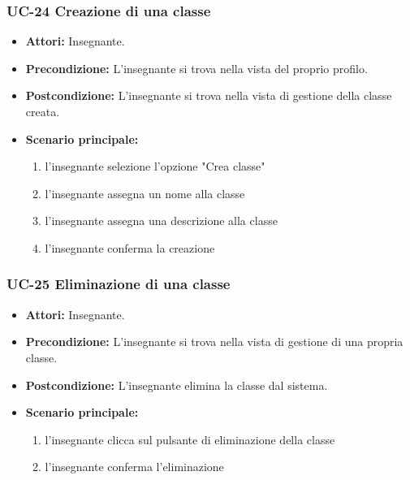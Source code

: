 \subsubsection{UC-24 Creazione di una classe}
\begin{itemize}
	\item \textbf{Attori:} Insegnante.
	\item \textbf{Precondizione:} L'insegnante si trova nella vista del proprio profilo.
	\item \textbf{Postcondizione:} L'insegnante si trova nella vista di gestione della classe creata.
	\item \textbf{Scenario principale:}
	\begin{enumerate}
		\item l'insegnante selezione l'opzione "Crea classe"
		\item l'insegnante assegna un nome alla classe
		\item l'insegnante assegna una descrizione alla classe
		\item l'insegnante conferma la creazione
	\end{enumerate}
\end{itemize}

\subsubsection{UC-25 Eliminazione di una classe}
\begin{itemize}
	\item \textbf{Attori:} Insegnante.
	\item \textbf{Precondizione:} L'insegnante si trova nella vista di gestione di una propria classe.
	\item \textbf{Postcondizione:} L'insegnante elimina la classe dal sistema.
	\item \textbf{Scenario principale:}
	\begin{enumerate}
		\item l'insegnante clicca sul pulsante di eliminazione della classe
		\item l'insegnante conferma l'eliminazione
	\end{enumerate}
\end{itemize}

